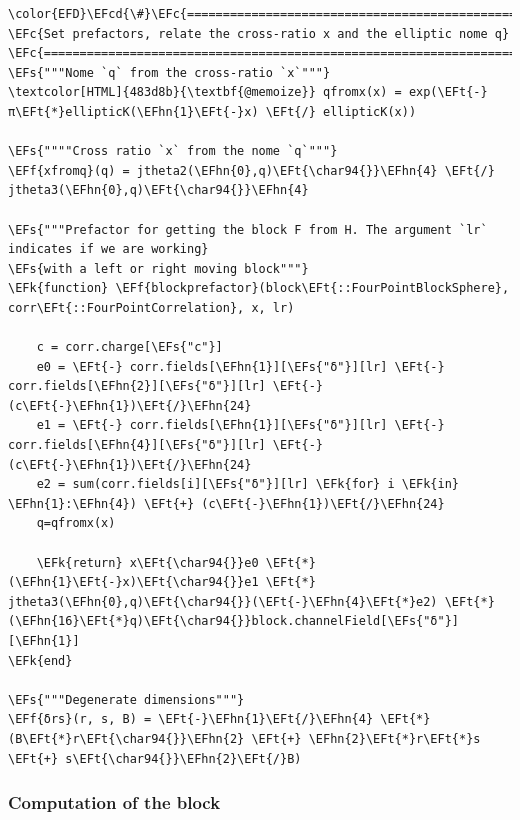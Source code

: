 \documentclass[a4paper]{article}
\numberwithin{equation}{section}
\newcommand{\EFc}[1]{\textcolor{EFc}{#1}} %
\newcommand{\EFcd}[1]{\textcolor{EFcd}{#1}} %
\newcommand{\EFs}[1]{\textcolor{EFs}{#1}} %
\newcommand{\EFk}[1]{\textcolor{EFk}{#1}} %
\newcommand{\EFf}[1]{\textcolor{EFf}{#1}} %
\newcommand{\EFt}[1]{\textcolor{EFt}{#1}} %
\newcommand{\EFhn}[1]{\textcolor{EFhn}{#1}} %
\begin{document}
\begin{Code}
\begin{Verbatim}
\color{EFD}\EFcd{\#}\EFc{===========================================================================================}
\EFc{Set prefactors, relate the cross-ratio x and the elliptic nome q}
\EFc{===========================================================================================\#}
\EFs{"""Nome `q` from the cross-ratio `x`"""}
\textcolor[HTML]{483d8b}{\textbf{@memoize}} qfromx(x) = exp(\EFt{-}π\EFt{*}ellipticK(\EFhn{1}\EFt{-}x) \EFt{/} ellipticK(x))

\EFs{""""Cross ratio `x` from the nome `q`"""}
\EFf{xfromq}(q) = jtheta2(\EFhn{0},q)\EFt{\char94{}}\EFhn{4} \EFt{/} jtheta3(\EFhn{0},q)\EFt{\char94{}}\EFhn{4}

\EFs{"""Prefactor for getting the block F from H. The argument `lr` indicates if we are working}
\EFs{with a left or right moving block"""}
\EFk{function} \EFf{blockprefactor}(block\EFt{::FourPointBlockSphere}, corr\EFt{::FourPointCorrelation}, x, lr)

    c = corr.charge[\EFs{"c"}]
    e0 = \EFt{-} corr.fields[\EFhn{1}][\EFs{"δ"}][lr] \EFt{-} corr.fields[\EFhn{2}][\EFs{"δ"}][lr] \EFt{-} (c\EFt{-}\EFhn{1})\EFt{/}\EFhn{24}
    e1 = \EFt{-} corr.fields[\EFhn{1}][\EFs{"δ"}][lr] \EFt{-} corr.fields[\EFhn{4}][\EFs{"δ"}][lr] \EFt{-} (c\EFt{-}\EFhn{1})\EFt{/}\EFhn{24}
    e2 = sum(corr.fields[i][\EFs{"δ"}][lr] \EFk{for} i \EFk{in} \EFhn{1}:\EFhn{4}) \EFt{+} (c\EFt{-}\EFhn{1})\EFt{/}\EFhn{24}
    q=qfromx(x)

    \EFk{return} x\EFt{\char94{}}e0 \EFt{*} (\EFhn{1}\EFt{-}x)\EFt{\char94{}}e1 \EFt{*} jtheta3(\EFhn{0},q)\EFt{\char94{}}(\EFt{-}\EFhn{4}\EFt{*}e2) \EFt{*} (\EFhn{16}\EFt{*}q)\EFt{\char94{}}block.channelField[\EFs{"δ"}][\EFhn{1}]
\EFk{end}

\EFs{"""Degenerate dimensions"""}
\EFf{δrs}(r, s, B) = \EFt{-}\EFhn{1}\EFt{/}\EFhn{4} \EFt{*} (B\EFt{*}r\EFt{\char94{}}\EFhn{2} \EFt{+} \EFhn{2}\EFt{*}r\EFt{*}s \EFt{+} s\EFt{\char94{}}\EFhn{2}\EFt{/}B)
\end{Verbatim}
\end{Code}
\subsubsection*{Computation of the block}
\label{sec:org54985d2}
\end{document}
